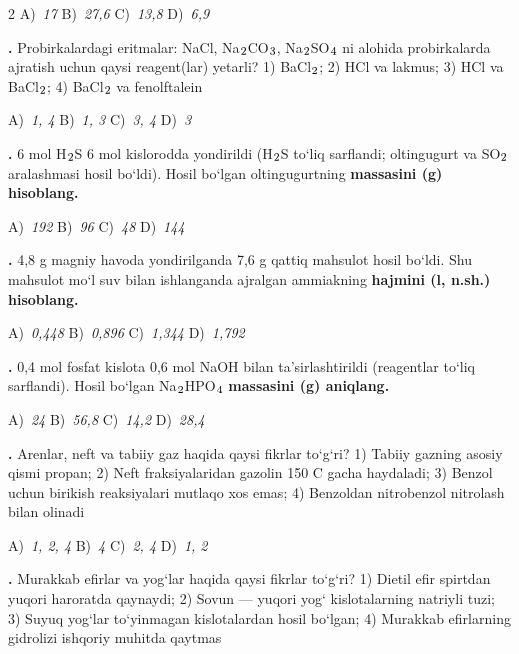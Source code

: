 \documentclass[11pt,a4paper]{article}
\renewcommand{\textsubscript}[1]{\ensuremath{_{\text{\fontsize{8}{8}\selectfont #1}}}}
\newcommand{\qn}[1]{\textbf{\fontsize{11.5}{13}\selectfont #1}}
\newcommand{\qsep}{\par\vspace{13pt}}
\begin{document}
\begin{multicols}{2}
\noindent A)~\textsl{17} \hfill B)~\textsl{27,6} \hfill C)~\textsl{13,8} \hfill D)~\textsl{6,9}\par
\qsep
\noindent\qn{16.} Probirkalardagi eritmalar: NaCl, Na\textsubscript{2}CO\textsubscript{3}, Na\textsubscript{2}SO\textsubscript{4} ni alohida probirkalarda ajratish uchun qaysi reagent(lar) yetarli? 1) BaCl\textsubscript{2}; 2) HCl va lakmus; 3) HCl va BaCl\textsubscript{2}; 4) BaCl\textsubscript{2} va fenolftalein

\noindent A)~\textsl{1, 4} \hfill B)~\textsl{1, 3} \hfill C)~\textsl{3, 4} \hfill D)~\textsl{3}\par
\qsep
\noindent\qn{17.} 6 mol H\textsubscript{2}S 6 mol kislorodda yondirildi (H\textsubscript{2}S to`liq sarflandi; oltingugurt va SO\textsubscript{2} aralashmasi hosil bo`ldi). Hosil bo`lgan oltingugurtning \textbf{massasini (g) hisoblang.}

\noindent A)~\textsl{192} \hfill B)~\textsl{96} \hfill C)~\textsl{48} \hfill D)~\textsl{144}\par
\qsep
\noindent\qn{18.} 4,8 g magniy havoda yondirilganda 7,6 g qattiq mahsulot hosil bo`ldi. Shu mahsulot mo`l suv bilan ishlanganda ajralgan ammiakning \textbf{hajmini (l, n.sh.) hisoblang.}

\noindent A)~\textsl{0,448} \hfill B)~\textsl{0,896} \hfill C)~\textsl{1,344} \hfill D)~\textsl{1,792}\par
\qsep
\noindent\qn{19.} 0,4 mol fosfat kislota 0,6 mol NaOH bilan ta'sirlashtirildi (reagentlar to`liq sarflandi). Hosil bo`lgan Na\textsubscript{2}HPO\textsubscript{4} \textbf{massasini (g) aniqlang.}

\noindent A)~\textsl{24} \hfill B)~\textsl{56,8} \hfill C)~\textsl{14,2} \hfill D)~\textsl{28,4}\par
\qsep
\noindent\qn{20.} Arenlar, neft va tabiiy gaz haqida qaysi fikrlar to`g`ri? 1) Tabiiy gazning asosiy qismi propan; 2) Neft fraksiyalaridan gazolin 150 \textdegree{}C gacha haydaladi; 3) Benzol uchun birikish reaksiyalari mutlaqo xos emas; 4) Benzoldan nitrobenzol nitrolash bilan olinadi

\noindent A)~\textsl{1, 2, 4} \hfill B)~\textsl{4} \hfill C)~\textsl{2, 4} \hfill D)~\textsl{1, 2}\par
\qsep
\noindent\qn{21.} Murakkab efirlar va yog`lar haqida qaysi fikrlar to`g`ri? 1) Dietil efir spirtdan yuqori haroratda qaynaydi; 2) Sovun --- yuqori yog` kislotalarning natriyli tuzi; 3) Suyuq yog`lar to`yinmagan kislotalardan hosil bo`lgan; 4) Murakkab efirlarning gidrolizi ishqoriy muhitda qaytmas


\end{multicols}
\end{document}
